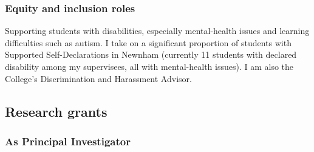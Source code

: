 \documentclass[11pt,a4paper]{article}
\begin{document}
\subsubsection{Equity and inclusion
roles}\label{equity-and-inclusion-roles}

Supporting students with disabilities, especially mental-health issues
and learning difficulties such as autism. I take on a significant
proportion of students with Supported Self-Declarations in Newnham
(currently 11 students with declared disability among my supervisees,
all with mental-health issues). I am also the College's Discrimination
and Harassment Advisor.

\subsection{Research grants}\label{research-grants}

\subsubsection{As Principal
Investigator}\label{as-principal-investigator}
\end{document}
